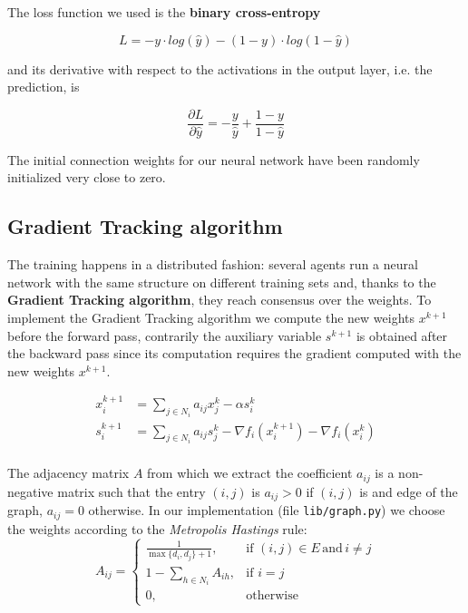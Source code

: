 \documentclass[a4paper,11pt,oneside]{book}
\begin{document}
The loss function we used is the \textbf{binary cross-entropy} 

\begin{equation}
L = - y \cdot log(\hat{y}) - (1 - y) \cdot log(1 - \hat{y})
\end{equation}

and its derivative with respect to the activations in the output layer, i.e. the prediction, is

\begin{equation}
\frac{\partial L}{\partial \hat{y}} = - \frac{y}{\hat{y}} + \frac{1 - y}{1 - \hat{y}}
\end{equation}

\bigskip 
The initial connection weights for our neural network have been randomly initialized very close to zero.

\subsection{Gradient Tracking algorithm}
The training happens in a distributed fashion: several agents run a neural network with the same structure on different training sets and, thanks to the \textbf{Gradient Tracking algorithm}, they reach consensus over the weights.
To implement the Gradient Tracking algorithm we compute the new weights $x^{k+1}$ before the forward pass, contrarily the auxiliary variable $s^{k+1}$ is obtained after the backward pass since its computation requires the gradient computed with the new weights $x^{k+1}$.

\begin {equation}
\begin{split}
x_i^{k+1} &= \sum_{j \in N_i} a_{ij} x_j^k - \alpha s_i^k \\
s_i^{k+1}   &= \sum_{j \in N_i} a_{ij} s_j^k - \nabla f_i(x_i^{k+1}) - \nabla f_i(x_i^k) \\
\end{split}
\end{equation}

The adjacency matrix $A$ from which we extract the coefficient $a_{ij}$ is a non-negative matrix such that the entry $(i,j)$ is $a_{ij}>0$ if $(i,j)$ is and edge of the graph, $a_{ij}=0$ otherwise.
In our implementation (file \texttt{lib/graph.py}) we choose the weights according to the \textit{Metropolis Hastings} rule:
\begin{equation}
A_{ij} = 
\begin{cases}
\frac{1}{\max\{d_i,d_j\}+1},  &\text{if } (i,j) \in E\, \text{and}\, i \neq j \\
1-\sum_{h \in N_i} A_{ih}, &\text{if }  i=j \\
0, &\text{otherwise}
\end{cases}
\end{equation}
\end{document}
